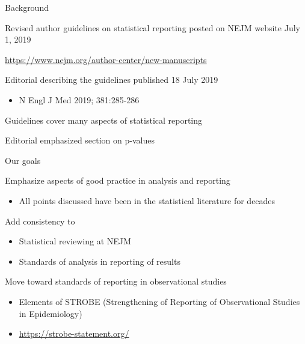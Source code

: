 \documentclass[ignorenonframetext,]{beamer}
\providecommand{\tightlist}{%
  \setlength{\itemsep}{0pt}\setlength{\parskip}{0pt}}
\begin{document}
\begin{frame}{Background}
\protect\hypertarget{background}{}

Revised author guidelines on statistical reporting posted on NEJM
website July 1, 2019

\url{https://www.nejm.org/author-center/new-manuscripts}

Editorial describing the guidelines published 18 July 2019

\begin{itemize}
\tightlist
\item
  N Engl J Med 2019; 381:285-286
\end{itemize}

Guidelines cover many aspects of statistical reporting

Editorial emphasized section on p-values

\end{frame}

\begin{frame}{Our goals}
\protect\hypertarget{our-goals}{}

Emphasize aspects of good practice in analysis and reporting

\begin{itemize}
\tightlist
\item
  All points discussed have been in the statistical literature for
  decades
\end{itemize}

Add consistency to

\begin{itemize}
\item
  Statistical reviewing at NEJM
\item
  Standards of analysis in reporting of results
\end{itemize}

Move toward standards of reporting in observational studies

\begin{itemize}
\item
  Elements of STROBE (Strengthening of Reporting of Observational
  Studies in Epidemiology)
\item
  \url{https://strobe-statement.org/}
\end{itemize}

\end{frame}
\end{document}
